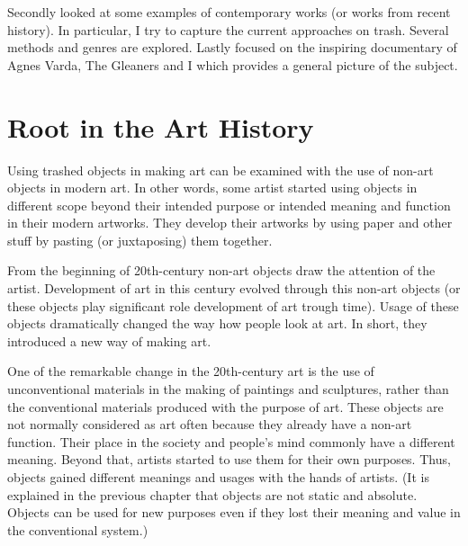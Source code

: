 Secondly looked at some examples of contemporary works (or works from recent history). In particular, I try to capture the current approaches on trash. Several methods and genres are explored.  Lastly focused on the inspiring documentary of Agnes Varda, The Gleaners and I which provides a general picture of the subject.





%
%
\section{Root in the Art History}
Using trashed objects in making art can be examined with the use of non-art objects in modern art. In other words, some artist started using objects in different scope beyond their intended purpose or intended meaning and function in their modern artworks. They develop their artworks by using paper and other stuff by pasting (or juxtaposing) them together. 



From the beginning of 20th-century non-art objects draw the attention of the artist. Development of art in this century evolved through this non-art objects (or these objects play significant role development of art trough time). Usage of these objects dramatically changed the way how people look at art. In short, they introduced a new way of making art.

One of the remarkable change in the 20th-century art is the use of unconventional materials in the making of paintings and sculptures, rather than the conventional materials produced with the purpose of art. These objects are not normally considered as art often because they already have a non-art function. Their place in the society and people's mind commonly have a different meaning. Beyond that, artists started to use them for their own purposes. Thus, objects gained different meanings and usages with the hands of artists. (It is explained in the previous chapter that objects are not static and absolute. Objects can be used for new purposes even if they lost their meaning and value in the conventional system.)


